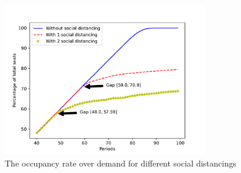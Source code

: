\begin{figure}[h]
  \centering
    \includegraphics[width=0.8\textwidth]{./Figures/distance.pdf}
  \caption{The occupancy rate over demand for different social distancings}
\end{figure}










